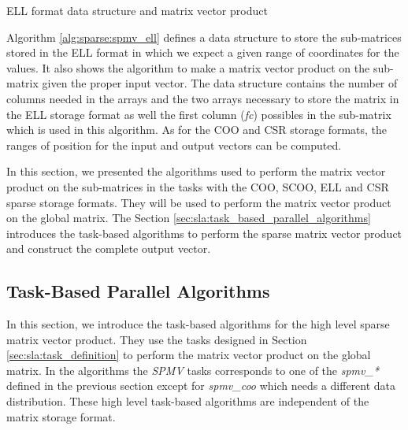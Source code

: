 \begin{algorithm}[h]
	\DontPrintSemicolon
	\SetAlgoVlined
	\caption{ELL format data structure and matrix vector product\label{alg:sparse:spmv_ell}}

	\;
\end{algorithm}

Algorithm \ref{alg:sparse:spmv_ell} defines a data structure to store the sub-matrices stored in the ELL format in which we expect a given range of coordinates for the values.
It also shows the algorithm to make a matrix vector product on the sub-matrix given the proper input vector.
The data structure contains the number of columns needed in the arrays and the two arrays necessary to store the matrix in the ELL storage format as well the first column (\textit{fc}) possibles in the sub-matrix which is used in this algorithm.
As for the COO and CSR storage formats, the ranges of position for the input and output vectors can be computed.

In this section, we presented the algorithms used to perform the matrix vector product on the sub-matrices in the tasks with the COO, SCOO, ELL and CSR sparse storage formats.
They will be used to perform the matrix vector product on the global matrix.
The Section \ref{sec:sla:task_based_parallel_algorithms} introduces the task-based algorithms to perform the sparse matrix vector product and construct the complete output vector.

\subsection{Task-Based Parallel Algorithms \label{sec:sla:task_based_parallel_algorithms}}

In this section, we introduce the task-based algorithms for the high level sparse matrix vector product.
They use the tasks designed in Section \ref{sec:sla:task_definition} to perform the matrix vector product on the global matrix.
In the algorithms the \textit{SPMV} tasks corresponds to one of the \textit{spmv\_*} defined in the previous section except for \textit{spmv\_coo} which needs a different data distribution.
These high level task-based algorithms are independent of the matrix storage format.


